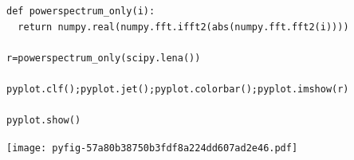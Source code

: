 \documentclass{report}
\begin{document}
\begin{lstlisting}
def powerspectrum_only(i):
  return numpy.real(numpy.fft.ifft2(abs(numpy.fft.fft2(i))))

r=powerspectrum_only(scipy.lena())

pyplot.clf();pyplot.jet();pyplot.colorbar();pyplot.imshow(r)

pyplot.show()

\end{lstlisting}















\noindent
\texttt{[image: pyfig-57a80b38750b3fdf8a224dd607ad2e46.pdf]}
\end{document}
